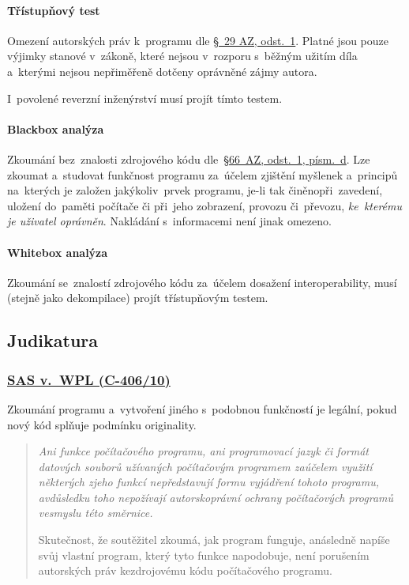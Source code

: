 \paragraph{Třístupňový test} Omezení autorských práv k~programu dle \href{https://www.zakonyprolidi.cz/cs/2000-121#p66-6}{§~29 AZ, odst.~1}. Platné jsou pouze výjimky stanové v~zákoně, které nejsou v~rozporu s~běžným užitím díla a~kterými nejsou nepřiměřeně dotčeny oprávněné zájmy autora.

I~povolené reverzní inženýrství musí projít tímto testem.

\paragraph{Blackbox analýza} Zkoumání bez~znalosti zdrojového kódu dle~{\href{https://www.zakonyprolidi.cz/cs/2000-121#p66-1-d}{§66~AZ, odst.~1, písm.~d}}. Lze zkoumat a~studovat funkčnost programu za~účelem zjištění myšlenek a~principů na~kterých je založen jakýkoliv~prvek programu, je-li tak činěnopři~zavedení, uložení do~paměti počítače či při~jeho zobrazení, provozu či~převozu, \emph{ke~kterému je uživatel oprávněn}. Nakládání s~informacemi není jinak omezeno.

\paragraph{Whitebox analýza} Zkoumání se~znalostí zdrojového kódu za~účelem dosažení interoperability, musí (stejně jako dekompilace) projít třístupňovým testem.

\subsection{Judikatura}

\subsubsection{\href{https://curia.europa.eu/juris/liste.jsf?num=C-406\%2F10}{SAS v.~WPL (C-406/10)}}

Zkoumání programu a~vytvoření jiného s~podobnou funkčností je legální, pokud nový kód splňuje podmínku originality.

\blockquote{
\itshape
Ani funkce počítačového programu, ani programovací jazyk či formát datových souborů užívaných počítačovým programem zaúčelem využití některých zjeho funkcí nepředstavují formu vyjádření tohoto programu, avdůsledku toho nepožívají autorskoprávní ochrany počítačových programů vesmyslu této směrnice.

Skutečnost, že soutěžitel zkoumá, jak program funguje, anásledně napíše svůj vlastní program, který tyto funkce napodobuje, není porušením autorských práv kezdrojovému kódu počítačového programu.}

